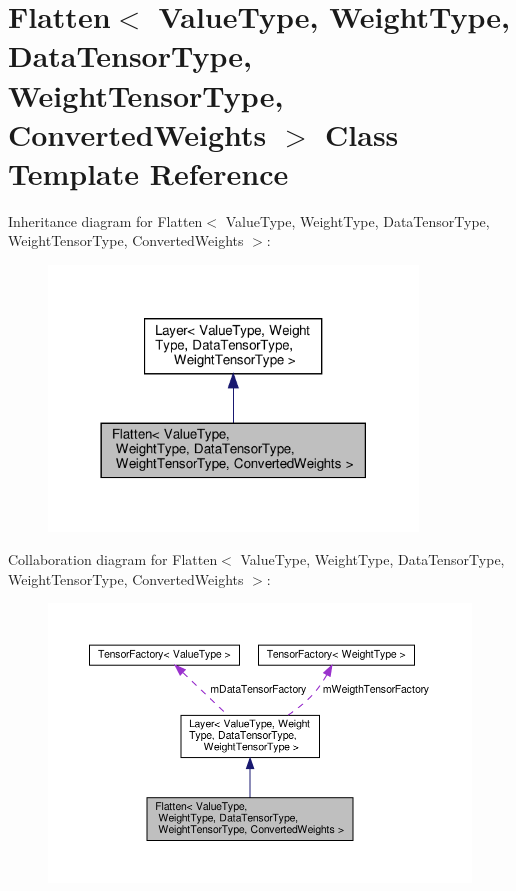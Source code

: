 \hypertarget{classFlatten}{}\section{Flatten$<$ Value\+Type, Weight\+Type, Data\+Tensor\+Type, Weight\+Tensor\+Type, Converted\+Weights $>$ Class Template Reference}
\label{classFlatten}


Inheritance diagram for Flatten$<$ Value\+Type, Weight\+Type, Data\+Tensor\+Type, Weight\+Tensor\+Type, Converted\+Weights $>$\+:
\nopagebreak
\begin{figure}[H]
\begin{center}
\leavevmode
\includegraphics[width=278pt]{classFlatten__inherit__graph}
\end{center}
\end{figure}


Collaboration diagram for Flatten$<$ Value\+Type, Weight\+Type, Data\+Tensor\+Type, Weight\+Tensor\+Type, Converted\+Weights $>$\+:
\nopagebreak
\begin{figure}[H]
\begin{center}
\leavevmode
\includegraphics[width=350pt]{classFlatten__coll__graph}
\end{center}
\end{figure}
